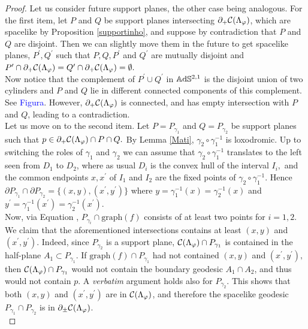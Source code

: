 \begin{proof}
    Let us consider future support planes, the other case being analogous. For the first item, let $P$ and $Q$ be support planes intersecting $\partial_+\mathcal{C}(\Lambda_\varphi)$, which are spacelike by Proposition \ref{supportinho}, and suppose by contradiction that $P$ and $Q$ are disjoint. Then we can slightly move them in the future to get spacelike planes, $P^{\prime}, Q^{\prime}$ such that $P,Q,P^{\prime}$ and $Q^{\prime}$ are mutually disjoint and $P^{\prime}\cap \partial_+\mathcal{C}(\Lambda_\varphi)=Q^{\prime}\cap\partial_+\mathcal{C}(\Lambda_\varphi)=\emptyset.$ %
    \\
    Now notice that the complement of $P^{\prime}\cup Q^{\prime}$ in $\mathbb{A}\mathrm{d}\mathbb{S}^{2,1}$ is the disjoint union of two cylinders and $P$ and $Q$ lie in different connected components of this complement. See \textcolor{blue}{Figura}. However, $\partial_+\mathcal{C}(\Lambda_\varphi)$ is connected, and has empty intersection with $P$ and $Q$, leading to a contradiction. \\
    Let us move on to the second item. Let $P=P_{\gamma_1}$ and $Q=P_{\gamma_2}$ be support planes such that $p\in\partial_+\mathcal{C}(\Lambda_\varphi)\cap P\cap Q.$ By Lemma \ref{Mati}, $\gamma_2\circ\gamma_1^{-1}$ is loxodromic.  Up to switching the roles of $\gamma_1$ and $\gamma_2$ we can assume that $\gamma_2\circ\gamma_1^{-1}$ translates to the left seen from $D_1$ to $D_2$, where as usual $D_i$ is the convex hull of the interval $I_i,$ and the common endpoints $x,x^{\prime}$ of $I_1$ and $I_2$ are the fixed points of $\gamma_2\circ\gamma_1^{-1}.$ Hence $\partial P_{\gamma_1}\cap\partial P_{\gamma_2}=\{(x,y),(x^{\prime}, y^{\prime})\}$ where $y=\gamma_1^{-1}(x)=\gamma_2^{-1}(x)$ and $y^{\prime}=\gamma_1^{-1}(x^{\prime})=\gamma_2^{-1}(x^{\prime})$. \\
    Now, via Equation , $P_{\gamma_i}\cap\text{graph}(f)$ consists of at least two points for $i=1,2$. We claim that the aforementioned intersections contains at least $(x,y)$ and $(x^{\prime},y^{\prime})$. Indeed, since $P_{\gamma_2}$ is a support plane, $\mathcal{C}(\Lambda_\varphi)\cap P_{\gamma_1}$ is contained in the half-plane $A_1 \subset P_{\gamma_1}.$ If $\text{graph}(f)\cap P_{\gamma_1}$ had not contained $(x,y)$ and $(x^{\prime} ,y^{\prime}),$ then $\mathcal{C}(\Lambda_\varphi)\cap P_{\gamma_1}$ would not contain the boundary geodesic $A_1 \cap A_2$, and thus would not contain $p$. A \textit{verbatim} argument holds also for $P_{\gamma_2}$. This shows that both $(x,y)$ and $(x^{\prime},y^{\prime})$ are in $\mathcal{C}(\Lambda_\varphi)$, and therefore the spacelike geodesic $P_{\gamma_1}\cap P_{\gamma_2}$ is in $\partial_\pm\mathcal{C}(\Lambda_\varphi)$. \\ 
\end{proof}

